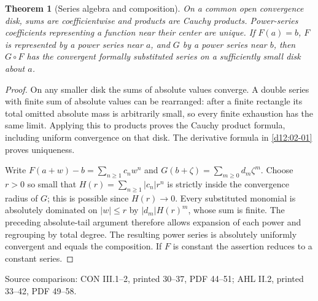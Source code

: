 \documentclass[11pt,a4paper,openany]{book}
\newtheorem{theorem}{Theorem}[chapter]
\theoremstyle{definition}
\theoremstyle{remark}\newtheorem{remark}[theorem]{Remark}
\newcommand{\family}[1]{}
\newcommand{\source}[1]{\par\begingroup\small\sffamily\color{black!65}Source comparison: #1\par\endgroup}
\begin{document}
\begin{theorem}[Series algebra and composition]\family{D12.02.02}\label{d12:02-02}
On a common open convergence disk, sums are coefficientwise and products
are Cauchy products. Power-series coefficients representing a function
near their center are unique. If \(F(a)=b\), \(F\) is represented by a
power series near \(a\), and \(G\) by a power series near \(b\), then
\(G\circ F\) has the convergent formally substituted series on a sufficiently
small disk about \(a\).
\end{theorem}
\begin{proof}
On any smaller disk the sums of absolute values converge. A double series
with finite sum of absolute values can be rearranged: after a finite
rectangle its total omitted absolute mass is arbitrarily small, so every
finite exhaustion has the same limit. Applying this to products proves
the Cauchy product formula, including uniform convergence on that disk.
The derivative formula in \cref{d12:02-01} proves uniqueness.

Write \(F(a+w)-b=\sum_{n\ge1}c_nw^n\) and
\(G(b+\zeta)=\sum_{m\ge0}d_m\zeta^m\).
Choose \(r>0\) so small that
\(H(r)=\sum_{n\ge1}|c_n|r^n\) is strictly inside the convergence radius
of \(G\); this is possible since \(H(r)\to0\).
Every substituted monomial is absolutely dominated on \(|w|\le r\) by
\(|d_m|H(r)^m\), whose sum is finite. The preceding absolute-tail argument
therefore allows expansion of each power and regrouping by total degree.
The resulting power series is absolutely uniformly convergent and equals
the composition. If \(F\) is constant the assertion reduces to a constant
series.
\end{proof}
\source{CON III.1--2, printed 30--37, PDF 44--51; AHL II.2, printed 33--42, PDF 49--58.}
\end{document}
